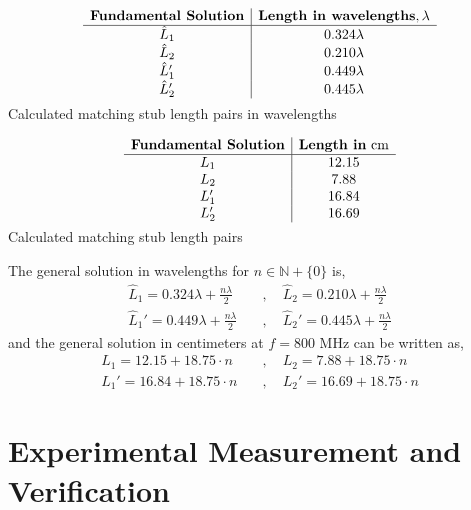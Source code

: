 \documentclass[10pt]{article}
\begin{document}
\begin{table}[h]
  \centering
  \begin{subtable}{0.8\textwidth}
    \[
      \begin{array}{c|c}
          \textbf{Fundamental Solution} & \textbf{Length in wavelengths}, \lambda \\ \hline
          \hat L_1 & 0.324 \lambda \\
          \hat L_2 & 0.210 \lambda \\
          \hat L_1' & 0.449 \lambda\\
          \hat L_2' & 0.445 \lambda\vspace{-0.25cm}
      \end{array}
  \]
  \caption{Calculated matching stub length pairs in wavelengths\vspace{0.15cm}}
  \end{subtable}
  \begin{subtable}{0.8\textwidth}
    \[
        \begin{array}{c|c}
            \textbf{Fundamental Solution} & \textbf{Length in} \text{ cm}\\ \hline
            L_1 & 12.15\\
            L_2 & 7.88\\
            L_1' & 16.84\\
            L_2' & 16.69\vspace{-0.25cm}
        \end{array}
    \]
    \caption{Calculated matching stub length pairs}
  \end{subtable}
\end{table}

The general solution in wavelengths for $n \in \mathbb{N} + \{0\}$ is, 
\begin{align*}
  \hat L_1 = 0.324 \lambda + \frac{n\lambda}{2} \quad &, \quad \hat L_2 = 0.210\lambda + \frac{n\lambda}{2}\\
  \hat L_1' = 0.449\lambda + \frac{n\lambda}{2} \quad &, \quad \hat L_2' = 0.445\lambda + \frac{n\lambda}{2}
\end{align*}
and the general solution in centimeters at $f = 800\text{ MHz}$ can be written as,
\begin{align*}
  L_1 = 12.15 + 18.75\cdot n \quad &, \quad L_2 = 7.88 + 18.75\cdot n\\
  L_1' = 16.84 + 18.75\cdot n \quad &, \quad L_2' = 16.69 +  18.75\cdot n
\end{align*}

\section{Experimental Measurement and Verification}
\end{document}

